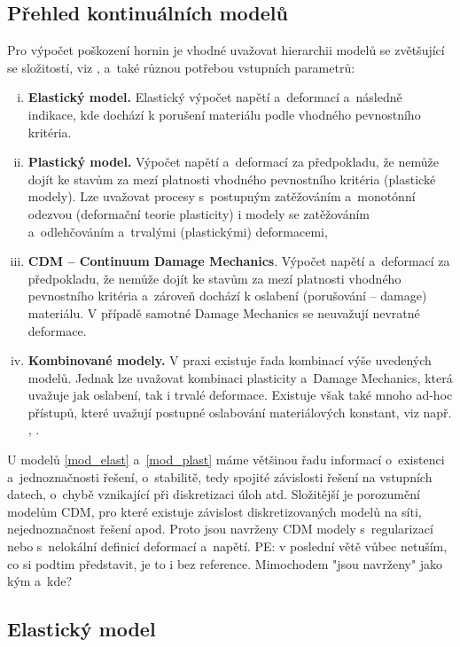 \documentclass{article}
\newcommand{\pe}[1]{{\color{orange} PE: #1}}
\begin{document}
\subsection{Přehled kontinuálních modelů} 

Pro výpočet poškození hornin je vhodné uvažovat hierarchii modelů se zvětšující se složitostí, viz \cite{Blaheta2013a}, a~také různou potřebou vstupních parametrů:
\begin{enumerate}[(i)]
	\item \label{mod_elast} {\bf Elastický model.} Elastický výpočet napětí a~deformací a~následně indikace, kde dochází k porušení materiálu podle vhodného pevnostního kritéria.
	\item \label{mod_plast} {\bf Plastický model.} Výpočet napětí a~deformací za předpokladu, že nemůže dojít ke stavům za mezí platnosti vhodného pevnostního kritéria (plastické modely). Lze uvažovat procesy s~postupným zatěžováním a~monotónní odezvou (deformační teorie plasticity) i modely se zatěžováním a~odlehčováním a~trvalými (plastickými) deformacemi,
	\item \label{mod_damage} {\bf CDM -- Continuum Damage Mechanics}. Výpočet napětí a~deformací za předpokladu, že nemůže dojít ke stavům za mezí platnosti vhodného pevnostního kritéria a~zároveň dochází k oslabení (porušování --  damage) materiálu. V případě samotné Damage Mechanics se neuvažují nevratné deformace.
	\item \label{mod_irev_cdm} {\bf Kombinované modely.} V praxi existuje řada kombinací výše uvedených modelů. Jednak lze uvažovat kombinaci plasticity a~Damage Mechanics, která uvažuje jak oslabení, tak i trvalé deformace. Existuje však také mnoho ad-hoc přístupů, které uvažují postupné oslabování materiálových konstant, viz např. \cite{Perras2016}, \cite{Carranza-Torres1999}.
\end{enumerate}
U modelů \eqref{mod_elast} a~\eqref{mod_plast} máme většinou řadu informací o~existenci a~jednoznačnosti
řešení, o~stabilitě, tedy spojité závislosti řešení na vstupních datech, o~chybě vznikající  při  diskretizaci  úloh  atd.  Složitější je porozumění  modelům CDM, pro které existuje závislost diskretizovaných  modelů na  síti, nejednoznačnost řešení  apod. Proto jsou navrženy CDM modely s~regularizací nebo s~nelokální definicí deformací a~napětí. \pe{v poslední větě vůbec netuším, co si podtim představit, je to i bez reference. Mimochodem "jsou navrženy" jako kým a~kde?}



\subsection{Elastický model}
\end{document}
